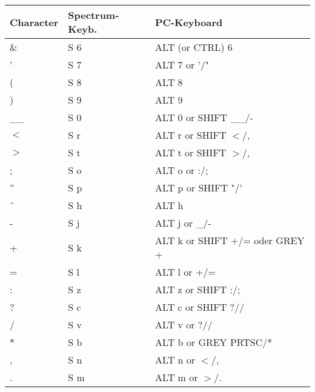 \begin{tabular}{|l|l|l|}
  \hline
   Character & Spectrum-Keyb. & PC-Keyboard \\
  \hline
  \hline
   \&   &    S 6   &   ALT (or CTRL) 6                  \\
   '    &    S 7   &   ALT 7 or '/"                     \\
   (    &    S 8   &   ALT 8                            \\
   )    &    S 9   &   ALT 9                            \\
   \_\_ &    S 0   &   ALT 0 or SHIFT \_\_/-            \\
   $<$  &    S r   &   ALT r or SHIFT $<$/,             \\
   $>$  &    S t   &   ALT t or SHIFT $>$/,             \\
   ;    &    S o   &   ALT o or :/;                     \\
   ''   &    S p   &   ALT p or SHIFT "/'               \\
   \^\  &    S h   &   ALT h                            \\
   -    &    S j   &   ALT j or \_/-                    \\
   +    &    S k   &   ALT k or SHIFT +/= oder GREY +   \\
   =    &    S l   &   ALT l or +/=                     \\
   :    &    S z   &   ALT z or SHIFT :/;               \\
   ?    &    S c   &   ALT c or SHIFT ?//               \\
   /    &    S v   &   ALT v or ?//                     \\
   $*$  &    S b   &   ALT b or GREY PRTSC/*            \\
   ,    &    S n   &   ALT n or $<$/,                   \\
   .    &    S m   &   ALT m or $>$/.                   \\
  \hline
\end{tabular}

